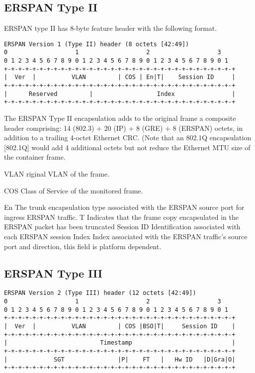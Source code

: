 \documentclass{sigplanconf}
\begin{document}
\subsection{ERSPAN Type II}
ERSPAN type II has 8-byte feature header with the following format.
{\scriptsize
\begin{verbatim}
ERSPAN Version 1 (Type II) header (8 octets [42:49])
0                   1                   2                   3
0 1 2 3 4 5 6 7 8 9 0 1 2 3 4 5 6 7 8 9 0 1 2 3 4 5 6 7 8 9 0 1
+-+-+-+-+-+-+-+-+-+-+-+-+-+-+-+-+-+-+-+-+-+-+-+-+-+-+-+-+-+-+-+-+
|  Ver  |          VLAN         | COS | En|T|    Session ID     |
+-+-+-+-+-+-+-+-+-+-+-+-+-+-+-+-+-+-+-+-+-+-+-+-+-+-+-+-+-+-+-+-+
|      Reserved         |                  Index                |
+-+-+-+-+-+-+-+-+-+-+-+-+-+-+-+-+-+-+-+-+-+-+-+-+-+-+-+-+-+-+-+-+
\end{verbatim}
}

The ERSPAN Type II encapsulation adds to the original
frame a composite header comprising: 14 (802.3) + 20 (IP) + 8 (GRE)
 + 8 (ERSPAN) octets, in addition to a trailing 4-octet Ethernet CRC.
(Note that an 802.1Q encapsulation [802.1Q] would add 4 additional
octets but not reduce the Ethernet MTU size of the container frame.

VLAN riginal VLAN of the frame.

COS
Class of Service of the monitored frame.

En
The trunk encapsulation type associated with the ERSPAN source port for  ingress ERSPAN traffic.
T
Indicates that the frame copy encapsulated in the ERSPAN packet has been truncated
Session ID
Identification associated with each ERSPAN session
Index
Index associated with the ERSPAN traffic's source port and direction, this field is platform dependent.

\subsection{ERSPAN Type III}
{\scriptsize
\begin{verbatim}
ERSPAN Version 2 (Type III) header (12 octets [42:49])
0                   1                   2                   3
0 1 2 3 4 5 6 7 8 9 0 1 2 3 4 5 6 7 8 9 0 1 2 3 4 5 6 7 8 9 0 1
+-+-+-+-+-+-+-+-+-+-+-+-+-+-+-+-+-+-+-+-+-+-+-+-+-+-+-+-+-+-+-+-+
|  Ver  |          VLAN         | COS |BSO|T|     Session ID    |
+-+-+-+-+-+-+-+-+-+-+-+-+-+-+-+-+-+-+-+-+-+-+-+-+-+-+-+-+-+-+-+-+
|                          Timestamp                            |
+-+-+-+-+-+-+-+-+-+-+-+-+-+-+-+-+-+-+-+-+-+-+-+-+-+-+-+-+-+-+-+-+
|             SGT               |P|    FT   |   Hw ID   |D|Gra|O|
+-+-+-+-+-+-+-+-+-+-+-+-+-+-+-+-+-+-+-+-+-+-+-+-+-+-+-+-+-+-+-+-+
\end{verbatim}
}
\end{document}
